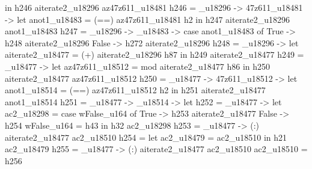                                      in h246 aiterate2_u18296 az47z611_u18481
         h246 = _u18296 -> \az47z611_u18481 -> let
                                                           anot1_u18483 = (==) az47z611_u18481 h2
                                                         in h247 aiterate2_u18296 anot1_u18483
         h247 = _u18296 -> _u18483 -> case anot1_u18483 of
                                                        True -> h248 aiterate2_u18296
                                                        False -> h272 aiterate2_u18296
         h248 = _u18296 -> let
                                       aiterate2_u18477 = (+) aiterate2_u18296 h87
                                     in h249 aiterate2_u18477
         h249 = _u18477 -> let
                                       az47z611_u18512 = mod aiterate2_u18477 h86
                                     in h250 aiterate2_u18477 az47z611_u18512
         h250 = _u18477 -> \az47z611_u18512 -> let
                                                           anot1_u18514 = (==) az47z611_u18512 h2
                                                         in h251 aiterate2_u18477 anot1_u18514
         h251 = _u18477 -> _u18514 -> let
                                                        h252 = _u18477 -> let
                                                                                      ac2_u18298 = case wFalse_u164 of
                                                                                                     True ->
                                                                                                       h253 aiterate2_u18477
                                                                                                     False ->
                                                                                                       h254
                                                                                      wFalse_u164 = h43
                                                                                    in h32 ac2_u18298
                                                        h253 = _u18477 -> (:) aiterate2_u18477 ac2_u18510
                                                        h254 = let ac2_u18479 = ac2_u18510
                                                               in h21 ac2_u18479
                                                        h255 = _u18477 -> (:) aiterate2_u18477 ac2_u18510
                                                        ac2_u18510 = h256
